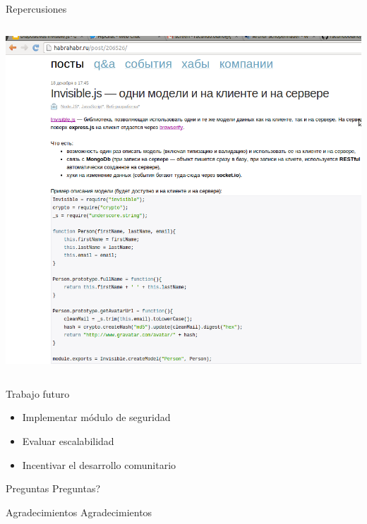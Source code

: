 \documentclass[xcolor=dvipsnames, 14pt]{beamer}
\newenvironment{reference}[2]{%
  \begin{textblock*}{\textwidth}(#1,#2)
      \footnotesize\it\bgroup\color{gray!50!black}}{\egroup\end{textblock*}}
\begin{document}
\begin{frame}{Repercusiones}
\begin{columns}[t]
\begin{column}{0.5\textwidth}
    \begin{center}
        \includegraphics[width=\textwidth]{img/rusia.png}
    \end{center}
\end{column}
\end{columns}


\end{frame}

\begin{frame}{Trabajo futuro}
\begin{itemize}
    \item Implementar módulo de seguridad
    \item Evaluar escalabilidad
    \item Incentivar el desarrollo comunitario
\end{itemize}

\end{frame}

\begin{frame}[c]{Preguntas}
\Huge Preguntas?
\end{frame}


\begin{frame}[c]{Agradecimientos}
\Huge Agradecimientos
\end{frame}
\end{document}
